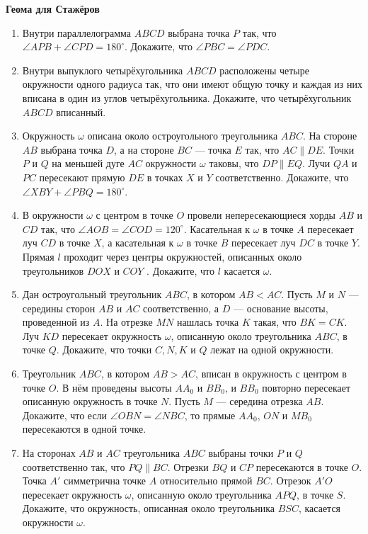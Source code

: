 \documentclass{article}
\begin{document}
\large


\begin{center}
\textbf{Геома для Стажёров}
\end{center}


\begin{enumerate}[label*=\protect\fbox{\arabic{enumi}}]

\item Внутри параллелограмма $ABCD$ выбрана точка $P$ так, что $\angle AP B+\angle CP D = 180^\circ$. Докажите, что $\angle PBC = \angle PDC$.

\item Внутри выпуклого четырёхугольника $ABCD$ расположены четыре окружности одного радиуса так, что они имеют общую точку и каждая из них вписана в один из углов четырёхугольника. Докажите, что четырёхугольник $ABCD$ вписанный.
\item Окружность $\omega$ описана около остроугольного треугольника $ABC$. На стороне $AB$ выбрана точка $D$, а на стороне $BC$ — точка $E$ так, что $AC \parallel DE$. Точки $P$ и $Q$ на меньшей дуге $AC$ окружности $\omega$ таковы, что $DP \parallel EQ$. Лучи $QA$ и $PC$ пересекают прямую $DE$ в точках $X$ и $Y$ соответственно. Докажите, что $\angle XBY + \angle P BQ = 180^\circ$.
\item В окружности $\omega$ с центром в точке $O$ провели непересекающиеся хорды $AB$ и $CD$ так, что $\angle AOB = \angle COD = 120^\circ$. Касательная к $\omega$ в точке $A$ пересекает луч $CD$ в точке $X$, а касательная к $\omega$ в точке $B$ пересекает луч $DC$ в точке $Y$. Прямая $l$ проходит через центры окружностей, описанных около треугольников $DOX$ и $COY$ . Докажите, что $l$ касается $\omega$.
\item Дан остроугольный треугольник $ABC$, в котором $AB < AC$. Пусть $M$ и $N$ — середины сторон $AB$ и $AC$ соответственно, а $D$ — основание высоты, проведенной из $A$. На отрезке $MN$ нашлась точка $K$ такая, что $BK = CK$. Луч $KD$ пересекает окружность $\omega$, описанную около треугольника $ABC$, в точке $Q$. Докажите, что точки $C, N, K$ и $Q$ лежат на одной окружности.
\item Треугольник $ABC$, в котором $AB > AC$, вписан в окружность с центром в точке $O$. В нём проведены высоты $AA_0$ и $BB_0$, и $BB_0$ повторно пересекает описанную окружность в точке $N$. Пусть $M$ — середина отрезка $AB$. Докажите, что если $\angle OBN = \angle NBC$, то прямые $AA_0$, $ON$ и $MB_0$ пересекаются в одной точке.
\item На сторонах $AB$ и $AC$ треугольника $ABC$ выбраны точки $P$ и $Q$ соответственно так, что $PQ \parallel BC$. Отрезки $BQ$ и $CP$ пересекаются в точке $O$. Точка $A'$ симметрична точке $A$ относительно прямой $BC$. Отрезок $A'O$ пересекает окружность $\omega$, описанную около треугольника $APQ$, в точке $S$. Докажите, что окружность, описанная около треугольника $BSC$, касается окружности $\omega$.


\end{enumerate}
\end{document}
